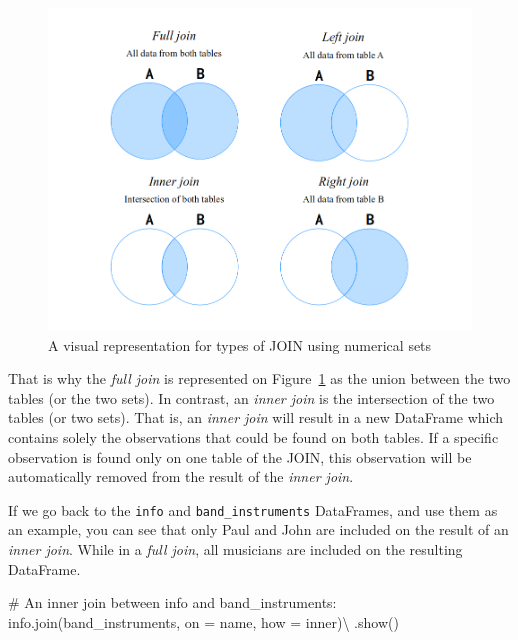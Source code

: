 \documentclass[
  11pt,
  letterpaper,
  DIV=11,
  numbers=noendperiod]{scrreprt}
\newenvironment{Shaded}{\begin{snugshade}}{\end{snugshade}}
\newcommand{\CommentTok}[1]{\textcolor[rgb]{0.37,0.37,0.37}{#1}}
\newcommand{\NormalTok}[1]{\textcolor[rgb]{0.00,0.23,0.31}{#1}}
\newcommand{\OperatorTok}[1]{\textcolor[rgb]{0.37,0.37,0.37}{#1}}
\newcommand{\StringTok}[1]{\textcolor[rgb]{0.13,0.47,0.30}{#1}}
\begin{document}
\begin{figure}

{\centering \includegraphics{Chapters/./../Figures/join-sets.png}

}

\caption{\label{fig-join-sets}A visual representation for types of JOIN
using numerical sets}

\end{figure}

That is why the \emph{full join} is represented on
Figure~\ref{fig-join-sets} as the union between the two tables (or the
two sets). In contrast, an \emph{inner join} is the intersection of the
two tables (or two sets). That is, an \emph{inner join} will result in a
new DataFrame which contains solely the observations that could be found
on both tables. If a specific observation is found only on one table of
the JOIN, this observation will be automatically removed from the result
of the \emph{inner join}.

If we go back to the \texttt{info} and \texttt{band\_instruments}
DataFrames, and use them as an example, you can see that only Paul and
John are included on the result of an \emph{inner join}. While in a
\emph{full join}, all musicians are included on the resulting DataFrame.

\begin{Shaded}
\begin{Highlighting}[]
\CommentTok{\# An inner join between \textasciigrave{}info\textasciigrave{} and \textasciigrave{}band\_instruments\textasciigrave{}:}
\NormalTok{info.join(band\_instruments, on }\OperatorTok{=} \StringTok{\textquotesingle{}name\textquotesingle{}}\NormalTok{, how }\OperatorTok{=} \StringTok{\textquotesingle{}inner\textquotesingle{}}\NormalTok{)}\OperatorTok{\textbackslash{}}
\NormalTok{    .show()}
\end{Highlighting}
\end{Shaded}
\end{document}
